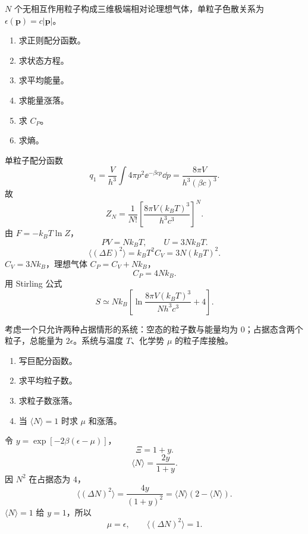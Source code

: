 \begin{question}[18 分]
$N$ 个无相互作用粒子构成三维极端相对论理想气体，单粒子色散关系为 $\epsilon(\bm p)=c|\bm p|$。
\begin{enumerate}
\item 求正则配分函数。
\item 求状态方程。
\item 求平均能量。
\item 求能量涨落。
\item 求 $C_P$。
\item 求熵。
\end{enumerate}
\begin{solution}
单粒子配分函数
\[q_1=\frac{V}{h^3}\int4\pi p^2\ee^{-\beta cp}\dd{p}=\frac{8\pi V}{h^3(\beta c)^3}.\]
故
\[\boxed{Z_N=\frac1{N!}\left[\frac{8\pi V(k_BT)^3}{h^3c^3}\right]^N}.\]
由 $F=-k_BT\ln Z$，
\[\boxed{PV=Nk_BT},\qquad \boxed{U=3Nk_BT}.\]
\[\boxed{\langle(\Delta E)^2\rangle=k_BT^2C_V=3N(k_BT)^2}.\]
$C_V=3Nk_B$，理想气体 $C_P=C_V+Nk_B$，
\[\boxed{C_P=4Nk_B}.\]
用 Stirling 公式
\[\boxed{S\simeq Nk_B\left[\ln\frac{8\pi V(k_BT)^3}{Nh^3c^3}+4\right]}.\]
\end{solution}
\end{question}

\begin{question}[16 分]
考虑一个只允许两种占据情形的系统：空态的粒子数与能量均为 $0$；占据态含两个粒子，总能量为 $2\epsilon$。系统与温度 $T$、化学势 $\mu$ 的粒子库接触。
\begin{enumerate}
\item 写巨配分函数。
\item 求平均粒子数。
\item 求粒子数涨落。
\item 当 $\langle N\rangle=1$ 时求 $\mu$ 和涨落。
\end{enumerate}
\begin{solution}
令 $y=\exp[-2\beta(\epsilon-\mu)]$，
\[\boxed{\Xi=1+y}.\]
\[\boxed{\langle N\rangle=\frac{2y}{1+y}}.\]
因 $N^2$ 在占据态为 $4$，
\[\boxed{\langle(\Delta N)^2\rangle=\frac{4y}{(1+y)^2}=\langle N\rangle(2-\langle N\rangle)}.\]
$\langle N\rangle=1$ 给 $y=1$，所以
\[\boxed{\mu=\epsilon},\qquad \boxed{\langle(\Delta N)^2\rangle=1}.\]
\end{solution}
\end{question}

